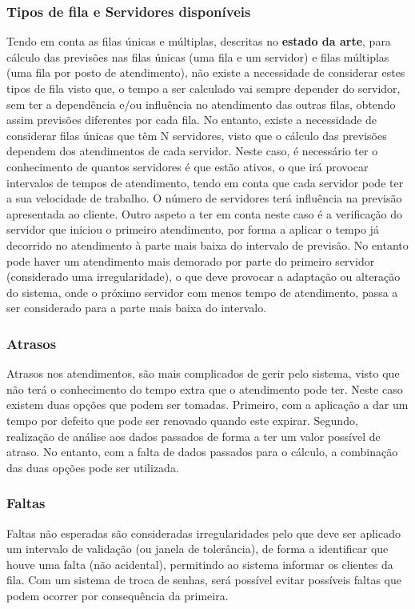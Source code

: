 \subsubsection{Tipos de fila e Servidores disponíveis}
Tendo em conta as filas únicas e múltiplas, descritas no \textbf{estado da arte}, para cálculo das previsões nas filas únicas (uma fila e um servidor) e filas múltiplas (uma fila por posto de atendimento), não existe a necessidade de considerar estes tipos de fila visto que, o tempo a ser calculado vai sempre depender do servidor, sem ter a dependência e/ou influência no atendimento das outras filas, obtendo assim previsões diferentes por cada fila. No entanto, existe a necessidade de considerar filas únicas que têm N servidores, visto que o cálculo das previsões dependem dos atendimentos de cada servidor. Neste caso, é necessário ter o conhecimento de quantos servidores é que estão ativos, o que irá provocar intervalos de tempos de atendimento, tendo em conta que cada servidor pode ter a sua velocidade de trabalho. O número de servidores terá influência na previsão apresentada ao cliente. Outro aspeto a ter em conta neste caso é a verificação do servidor que iniciou o primeiro atendimento, por forma a aplicar o tempo já decorrido no atendimento à parte mais baixa do intervalo de previsão. No entanto pode haver um atendimento mais demorado por parte do primeiro servidor (considerado uma irregularidade), o que deve provocar a adaptação ou alteração do sistema, onde o próximo servidor com menos tempo de atendimento, passa a ser considerado para a parte mais baixa do intervalo. 

\subsubsection{Atrasos}
Atrasos nos atendimentos, são mais complicados de gerir pelo sistema, visto que não terá o conhecimento do tempo extra que o atendimento pode ter. Neste caso existem duas opções que podem ser tomadas. Primeiro, com a aplicação a dar um tempo por defeito que pode ser renovado quando este expirar. Segundo, realização de análise aos dados passados de forma a ter um valor possível de atraso. No entanto, com a falta de dados passados para o cálculo, a combinação das duas opções pode ser utilizada. 

\subsubsection{Faltas}
Faltas não esperadas são consideradas irregularidades pelo que deve ser aplicado um intervalo de validação (ou janela de tolerância), de forma a identificar que houve uma falta (não acidental), permitindo ao sistema informar os clientes da fila. Com um sistema de troca de senhas, será possível evitar possíveis faltas que podem ocorrer por consequência da primeira.


